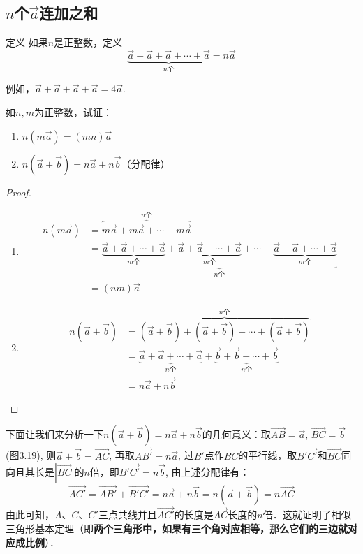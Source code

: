 \subsection{$n$个$\vec{a}$连加之和}

\begin{blk}{定义}
如果$n$是正整数，定义
\[\underbrace{\vec{a}+\vec{a}+\vec{a}+\cdots+\vec{a}}_{\text{$n$个}}=n\vec{a}\] 
\end{blk}

例如，$\vec{a}+\vec{a}+\vec{a}+\vec{a}=4\vec{a}$.

\begin{example}
如$n,m$为正整数，试证：
\begin{enumerate}
    \item $n\left(m\vec{a}\right)=(mn)\vec{a}$
    \item $n\left(\vec{a}+\vec{b}\right)=n\vec{a}+n\vec{b}$（分配律）
\end{enumerate}
\end{example}   

\begin{proof}
\begin{enumerate}
    \item 
\[\begin{split}
     n\left(m\vec{a}\right)&=\overbrace{m\vec{a}+m\vec{a}+\cdots +m\vec{a}}^{n\text{个}}\\
&=\underbrace{\underbrace{\vec{a}+\vec{a}+\cdots+\vec{a}}_{m\text{个}}+\underbrace{\vec{a}+\vec{a}+\cdots+\vec{a}}_{m\text{个}}+\cdots +\underbrace{\vec{a}+\vec{a}+\cdots+\vec{a}}_{m\text{个}}}_{n\text{个}}\\
&=(nm)\vec{a} 
\end{split}\]
\item 
\[\begin{split}
     n\left(\vec{a}+\vec{b}\right)&=\overbrace{\left(\vec{a}+\vec{b}\right)+\left(\vec{a}+\vec{b}\right)+\cdots +\left(\vec{a}+\vec{b}\right)}^{n\text{个}}\\
   &=  \underbrace{\vec{a}+\vec{a}+\cdots+\vec{a}}_{n\text{个}}+\underbrace{\vec{b}+\vec{b}+\cdots+\vec{b}}_{n\text{个}}\\
     &=n\vec{a}+n\vec{b}
\end{split}\]
\end{enumerate}    
\end{proof}

下面让我们来分析一下$n\left(\vec{a}+\vec{b}\right)=n\vec{a}+n\vec{b}$的几何意义：取$\Vec{AB}=\vec{a}$, $\Vec{BC}=\vec{b}$ (图3.19), 则$\vec{a}+\vec{b}=\Vec{AC}$, 再取$\Vec{AB'}=n\vec{a}$, 过$B'$点作$BC$的平行线，取$\Vec{B'C'}$和$\Vec{BC}$同向且其长是$|\Vec{BC}|$的$n$倍，即$\Vec{B'C'}=n\vec{b}$, 由上述分配律有：
\[\Vec{AC'}=\Vec{AB'}+\Vec{B'C'}=n\vec{a}+n\vec{b}=n\left(\vec{a}+\vec{b}\right)=n\Vec{AC}\]
由此可知，$A$、$C$、$C'$三点共线并且$\Vec{AC'}$的长度是$\Vec{AC}$长度的$n$倍．这就证明了相似三角形基本定理（即\textbf{两个三角形中，如果有三个角对应相等，那么它们的三边就对应成比例}）．

